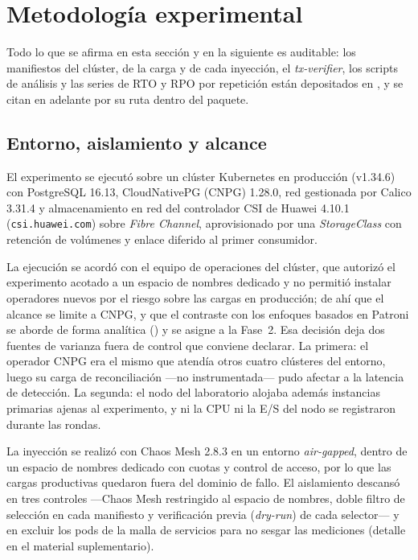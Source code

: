 \section{Metodología experimental}\label{sec:metodo}
Todo lo que se afirma en esta sección y en la siguiente es auditable: los manifiestos del clúster, de la carga y de cada inyección, el \textit{tx-verifier}, los scripts de análisis y las series de RTO y RPO por repetición están depositados en , y se citan en adelante por su ruta dentro del paquete.

\subsection{Entorno, aislamiento y alcance}\label{sec:entorno}
El experimento se ejecutó sobre un clúster Kubernetes en producción (v1.34.6) con PostgreSQL 16.13, CloudNativePG (CNPG) 1.28.0, red gestionada por Calico 3.31.4 y almacenamiento en red del controlador CSI de Huawei 4.10.1 (\texttt{csi.huawei.com}) sobre \textit{Fibre Channel}, aprovisionado por una \textit{StorageClass} con retención de volúmenes y enlace diferido al primer consumidor.

La ejecución se acordó con el equipo de operaciones del clúster, que autorizó el experimento acotado a un espacio de nombres dedicado y no permitió instalar operadores nuevos por el riesgo sobre las cargas en producción; de ahí que el alcance se limite a CNPG, y que el contraste con los enfoques basados en Patroni se aborde de forma analítica () y se asigne a la Fase~2. Esa decisión deja dos fuentes de varianza fuera de control que conviene declarar. La primera: el operador CNPG era el mismo que atendía otros cuatro clústeres del entorno, luego su carga de reconciliación —no instrumentada— pudo afectar a la latencia de detección. La segunda: el nodo del laboratorio alojaba además instancias primarias ajenas al experimento, y ni la CPU ni la E/S del nodo se registraron durante las rondas.

La inyección se realizó con Chaos Mesh 2.8.3 en un entorno \textit{air-gapped}, dentro de un espacio de nombres dedicado con cuotas y control de acceso, por lo que las cargas productivas quedaron fuera del dominio de fallo. El aislamiento descansó en tres controles —Chaos Mesh restringido al espacio de nombres, doble filtro de selección en cada manifiesto y verificación previa (\textit{dry-run}) de cada selector— y en excluir los pods de la malla de servicios para no sesgar las mediciones (detalle en el material suplementario).

